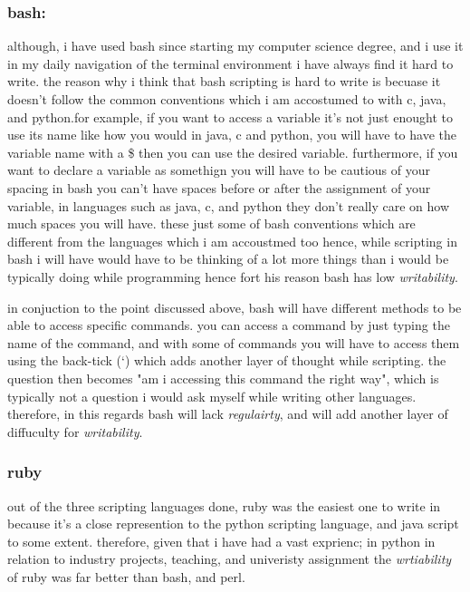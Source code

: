 \documentclass[
	12pt, %
]{fphw}
\begin{document}
\subsubsection{bash:} although, i have used bash since starting my computer science
degree, and i use it in my daily navigation of the terminal environment i have
always find it hard to write. the reason why i think that bash scripting is hard
to write is becuase it doesn't follow the common conventions which i am accostumed
to with c, java, and python.for example, if you want to access a variable it's not
just enought to use its name like how you would in java, c and python, you will have
to have the variable name with a \$ then you can use the desired variable. furthermore,
if you want to declare a variable as somethign you will have to be cautious of your
spacing in bash you can't have spaces before or after the assignment of your variable,
in languages such as java, c, and python they don't really care on how much spaces you
will have. these just some of bash conventions which are different from the
languages which i am accoustmed too hence, while scripting in bash i will have
would have to be thinking of a lot more things than i would be typically doing
while programming hence fort his reason bash has low \emph{writability}. \par

in conjuction to the point discussed above, bash will have different methods to
be able to access specific commands. you can access a command by just typing
the name of the command, and with some of commands you will have to access them
using the back-tick (`) which adds another layer of thought  while scripting.
the question then becomes "am i accessing this command the right way", which is
typically not a question i would ask myself while writing other languages.
therefore, in this regards bash will lack \emph{regulairty}, and will add another
layer of diffuculty for \emph{writability}.


\subsubsection{ruby} out of the three scripting languages done, ruby was the
easiest one to write in because it's a close represention to the python scripting
language, and java script to some extent. therefore, given that i have had a
vast exprienc; in python in relation to industry projects, teaching, and
univeristy assignment the \emph{wrtiability} of ruby was far better than bash,
and perl.\par
\end{document}
